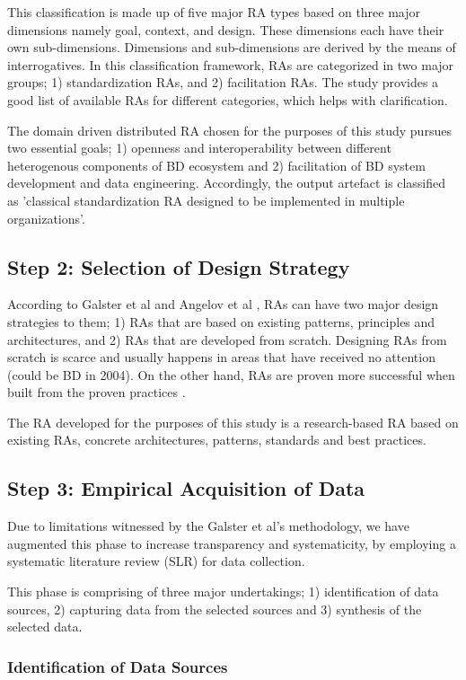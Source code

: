 \documentclass[runningheads]{llncs}
\begin{document}
This classification is made up of five major RA types based on three major dimensions namely goal, context, and design. These dimensions each have their own sub-dimensions. Dimensions and sub-dimensions are derived by the means of interrogatives. In this classification framework, RAs are categorized in two major groups; 1) standardization RAs, and 2) facilitation RAs. The study provides a good list of available RAs for different categories, which helps with clarification. 

The domain driven distributed RA chosen for the purposes of this study pursues two essential goals; 1) openness and interoperability between different heterogenous components of BD ecosystem and 2) facilitation of BD system development and data engineering. Accordingly, the output artefact is classified as 'classical standardization RA designed to be implemented in multiple organizations'. 

\subsection{Step 2: Selection of Design Strategy}
According to Galster et al \cite{GALSTER} and Angelov et al \cite{angelov2008towards}, RAs can have two major design strategies to them; 1) RAs that are based on existing patterns, principles and architectures, and 2) RAs that are developed from scratch. Designing RAs from scratch is scarce and usually happens in areas that have received no attention (could be BD in 2004). On the other hand, RAs are proven more successful when built from the proven practices \cite{Cloutier}. 

The RA developed for the purposes of this study is a research-based RA based on existing RAs, concrete architectures, patterns, standards and best practices.

\subsection{Step 3: Empirical Acquisition of Data}
Due to limitations witnessed by the Galster et al's methodology, we have augmented this phase to increase transparency and systematicity, by employing a systematic literature review (SLR) for data collection. 

This phase is comprising of three major undertakings; 1) identification of data sources, 2) capturing data from the selected sources and 3) synthesis of the selected data. 

\subsubsection{Identification of Data Sources\\}
\end{document}
